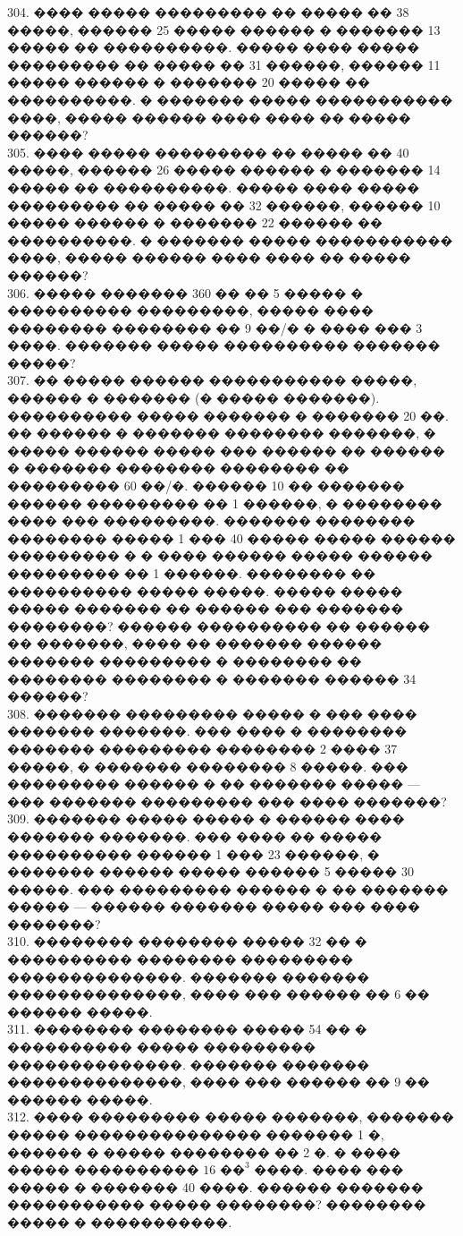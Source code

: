 \documentclass[12pt]{article}
\begin{document}
304. ���� ����� ��������� �� ����� �� 38 �����, ������ 25 ����� ������ � ������� 13 ����� �� ����������. ����� ���� ����� ��������� �� ����� �� 31 ������, ������ 11 ����� ������ � ������� 20 ����� �� ����������. � ������� ����� ����������� ����, ����� ������ ���� ���� �� ����� ������?\\
305. ���� ����� ��������� �� ����� �� 40 �����, ������ 26 ����� ������ � ������� 14 ����� �� ����������. ����� ���� ����� ��������� �� ����� �� 32 ������, ������ 10 ����� ������ � ������� 22 ������ �� ����������. � ������� ����� ����������� ����, ����� ������ ���� ���� �� ����� ������?\\
306. ����� ������� 360 �� �� 5 ����� � ���������� ���������, ����� ���� �������� �������� �� 9 ��/� � ���� ��� 3 ����. ������� ����� ���������� ������� �����?\\
307. �� ����� ������ ����������� �����, ������ � ������� (� ����� �������). ���������� ����� ������� � ������� 20 ��. �� ������ � ������� �������� �������, � ����� ������ ����� ��� ������ �� ������ � ������� �������� �������� �� ��������� 60 ��/�. ������ 10 �� ������� ������ ��������� �� 1 ������, � �������� ���� ��� ���������. ������� �������� �������� ����� 1 ��� 40 ����� ����� ������ ��������� � � ���� ������ ����� ������ ��������� �� 1 ������. �������� �� ���������� ����� �����. ����� ����� ����� ������� �� ������ ��� ������� ��������? ������ ���������� �� ������ �� �������, ���� �� ������� ������ ������� ��������� � �������� �� �������� �������� � ������� ������ 34 ������?\\
308. ������� ��������� ����� � ��� ���� ������� �������. ��� ���� � �������� ������� ��������� �������� 2 ���� 37 �����, � ������� �������� 8 �����. ��� ��������� ������ � �� ������� ����� --- ��� ������� ��������� ��� ���� �������?\\
309. ������� ����� ����� � ������ ���� ������� �������. ��� ���� �� ����� ���������� ������ 1 ��� 23 ������, � ������� ������ ����� ������ 5 ����� 30 �����. ��� ��������� ������ � �� ������� ����� --- ������ ������� ����� ��� ���� �������?\\
310. �������� �������� ����� 32 �� � ���������� �������� ��������� ��������������. ������� ������� ��������������, ���� ��� ������ �� 6 �� ������ �����.\\
311. �������� �������� ����� 54 �� � ���������� ����� ��������� ��������������. ������� ������� ��������������, ���� ��� ������ �� 9 �� ������ �����.\\
312. ���� ��������� ����� �������, ������� ����� ��������������� ������� 1 �, ������ � ����� �������� �� 2 �. � ���� ����� ���������� $16\text{ ��}^3$ ����. ���� ��� ����� � ������� 40 ����. ������ ������� ����������� ����� ��������? �������� ����� � �����������.\\
\end{document}

